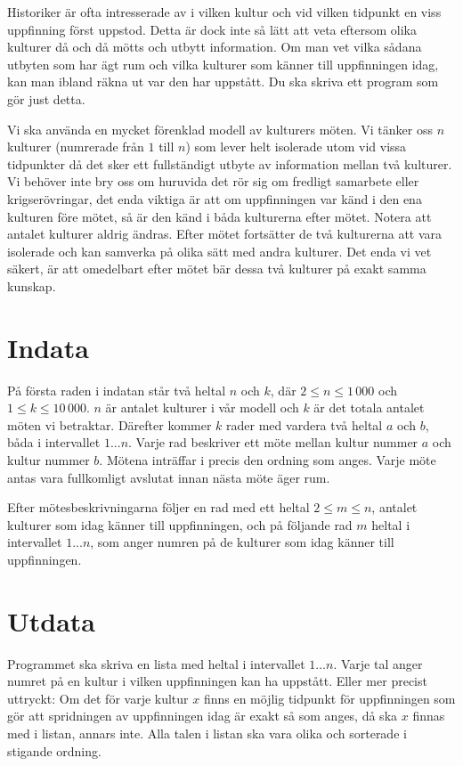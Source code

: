 
Historiker är ofta intresserade av i vilken kultur och vid vilken tidpunkt en viss uppfinning först uppstod. Detta är dock inte så lätt att veta eftersom olika kulturer då och då mötts och utbytt information. Om man vet vilka sådana utbyten som har ägt rum och vilka kulturer som känner till uppfinningen idag, kan man ibland räkna ut var den har uppstått. Du ska skriva ett program som gör just detta.

Vi ska använda en mycket förenklad modell av kulturers möten. Vi tänker oss $n$ kulturer (numrerade från $1$ till $n$) som lever helt isolerade utom vid vissa tidpunkter då det sker ett fullständigt utbyte av information mellan två kulturer. Vi behöver inte bry oss om huruvida det rör sig om fredligt samarbete eller krigserövringar, det enda viktiga är att om uppfinningen var känd i den ena kulturen före mötet, så är den känd i båda kulturerna efter mötet. Notera att antalet kulturer aldrig ändras. Efter mötet fortsätter de två kulturerna att vara isolerade och kan samverka på olika sätt med andra kulturer. Det enda vi vet säkert, är att omedelbart efter mötet bär dessa två kulturer på exakt samma kunskap.

\section*{Indata}
På första raden i indatan står två heltal $n$ och $k$, där $2 \le n \le 1\,000$ och $1 \le k \le 10\,000$. $n$ är antalet kulturer i vår modell och $k$ är det totala antalet möten vi betraktar. Därefter kommer $k$ rader med vardera två heltal $a$ och $b$, båda i intervallet $1...n$. Varje rad beskriver ett möte mellan kultur nummer $a$ och kultur nummer $b$. Mötena inträffar i precis den ordning som anges. Varje möte antas vara fullkomligt avslutat innan nästa möte äger rum.

Efter mötesbeskrivningarna följer en rad med ett heltal $2 \le m \le n$, antalet kulturer som idag känner till uppfinningen, och på följande rad $m$ heltal i intervallet $1...n$, som anger numren på de kulturer som idag känner till uppfinningen.

\section*{Utdata}
Programmet ska skriva en lista med heltal i intervallet $1...n$. Varje tal anger numret på en kultur i vilken uppfinningen kan ha uppstått. Eller mer precist uttryckt: Om det för varje kultur $x$ finns en möjlig tidpunkt för uppfinningen som gör att spridningen av uppfinningen idag är exakt så som anges, då ska $x$ finnas med i listan, annars inte. Alla talen i listan ska vara olika och sorterade i stigande ordning.
